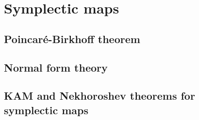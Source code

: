 \section{Symplectic maps}

\subsection{Poincaré-Birkhoff theorem}

\subsection{Normal form theory}

\subsection{KAM and Nekhoroshev theorems for symplectic maps}

